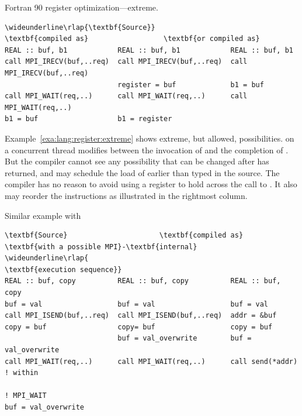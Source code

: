 \begin{example}
Fortran 90 register optimization---extreme.
\label{exa:lang:register:extreme}
%
%
\begin{Verbatim}[commandchars=\\\{\}]
\wideunderline\rlap{\textbf{Source}}                           \textbf{compiled as}                  \textbf{or compiled as}
REAL :: buf, b1            REAL :: buf, b1            REAL :: buf, b1
call MPI_IRECV(buf,..req)  call MPI_IRECV(buf,..req)  call MPI_IRECV(buf,..req)
                           register = buf             b1 = buf
call MPI_WAIT(req,..)      call MPI_WAIT(req,..)      call MPI_WAIT(req,..)
b1 = buf                   b1 = register
\end{Verbatim}
\lstset{fancyvrb=false}
\end{example}

Example~\ref{exa:lang:register:extreme}
shows extreme, but allowed, possibilities.
 on a concurrent thread modifies 
between the invocation of  and the completion of
.  But the compiler cannot see any possibility that
 can be changed after  has returned,
and may schedule the load of  earlier than
typed in the source. The compiler has no reason to avoid using a register to
hold  across the call to .  It also
may reorder the instructions as illustrated in the rightmost column.

\begin{example}
Similar example with 
\label{exa:lang:register:isend}
%
%
\begin{Verbatim}[commandchars=\\\{\}]
\textbf{Source}                      \textbf{compiled as}                  \textbf{with a possible MPI}-\textbf{internal}
\wideunderline\rlap{                                                      \textbf{execution sequence}}
REAL :: buf, copy          REAL :: buf, copy          REAL :: buf, copy
buf = val                  buf = val                  buf = val
call MPI_ISEND(buf,..req)  call MPI_ISEND(buf,..req)  addr = &buf
copy = buf                 copy= buf                  copy = buf
                           buf = val_overwrite        buf = val_overwrite
call MPI_WAIT(req,..)      call MPI_WAIT(req,..)      call send(*addr) ! within
                                                                       ! MPI_WAIT
buf = val_overwrite
\end{Verbatim}
\lstset{fancyvrb=false}
\end{example}

